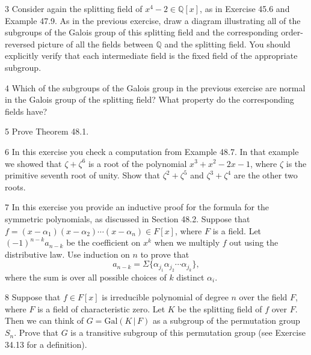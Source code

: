 \begin{problem}{3}
    Consider again the splitting field of $x^4 - 2 \in \mathbb{Q}[x]$, as in Exercise 45.6
    and Example 47.9. As in the previous exercise, draw a diagram illustrating all of the
    subgroups of the Galois group of this splitting field and the corresponding
    order-reversed picture of all the fields between $\mathbb{Q}$ and the splitting field.
    You should explicitly verify that each intermediate field is the fixed field of the
    appropriate subgroup.
\end{problem}
\unsolved

\begin{problem}{4}
    Which of the subgroups of the Galois group in the previous exercise are normal in the
    Galois group of the splitting field? What property do the corresponding fields have?
\end{problem}
\unsolved

\begin{problem}{5}
    Prove Theorem 48.1.
\end{problem}
\unsolved

\begin{problem}{6}
    In this exercise you check a computation from Example 48.7. In that example we showed
    that $\zeta + \zeta^6$ is a root of the polynomial $x^3 + x^2 - 2x - 1$, where $\zeta$
    is the primitive seventh root of unity. Show that $\zeta^2 + \zeta^5$ and
    $\zeta^3 + \zeta^4$ are the other two roots.
\end{problem}
\unsolved

\begin{problem}{7}
    In this exercise you provide an inductive proof for the formula for the symmetric
    polynomials, as discussed in Section 48.2. Suppose that
    $f = (x - \alpha_1)(x - \alpha_2)\cdots(x - \alpha_n) \in F[x]$, where $F$ is a field.
    Let ${(-1)}^{n - k}a_{n - k}$ be the coefficient on $x^k$ when we multiply $f$ out
    using the distributive law. Use induction on $n$ to prove that
    \[a_{n - k} = \Sigma\{\alpha_{j_1}\alpha_{j_2}\cdots\alpha_{j_k}\},\]
    where the sum is over all possible choices of $k$ distinct $\alpha_i$.
\end{problem}
\unsolved

\begin{problem}{8}
    Suppose that $f \in F[x]$ is irreducible polynomial of degree $n$ over the field $F$,
    where $F$ is a field of characteristic zero. Let $K$ be the splitting field of $f$ over
    $F$. Then we can think of $G = \mathrm{Gal}(K \,|\, F)$ as a subgroup of the
    permutation group $S_n$. Prove that $G$ is a transitive subgroup of this permutation
    group (see Exercise 34.13 for a definition).
\end{problem}
\unsolved
